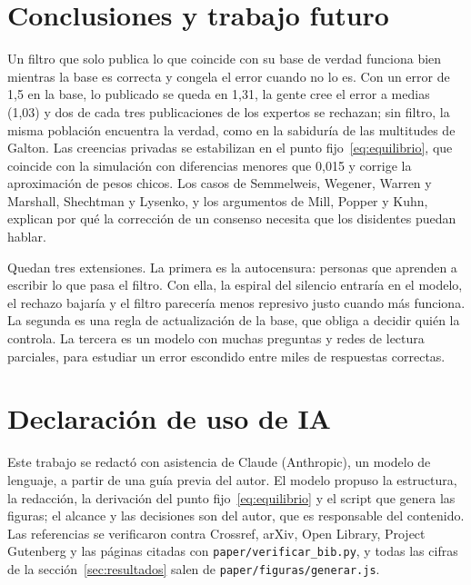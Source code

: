 \documentclass[11pt,a4paper]{article}
\begin{document}
\section{Conclusiones y trabajo futuro}\label{sec:conclusiones}

Un filtro que solo publica lo que coincide con su base de verdad funciona bien mientras la base es correcta y congela el error cuando no lo es. Con un error de 1,5 en la base, lo publicado se queda en 1,31, la gente cree el error a medias (1,03) y dos de cada tres publicaciones de los expertos se rechazan; sin filtro, la misma población encuentra la verdad, como en la sabiduría de las multitudes de Galton. Las creencias privadas se estabilizan en el punto fijo~\eqref{eq:equilibrio}, que coincide con la simulación con diferencias menores que 0,015 y corrige la aproximación de pesos chicos. Los casos de Semmelweis, Wegener, Warren y Marshall, Shechtman y Lysenko, y los argumentos de Mill, Popper y Kuhn, explican por qué la corrección de un consenso necesita que los disidentes puedan hablar.

Quedan tres extensiones. La primera es la autocensura: personas que aprenden a escribir lo que pasa el filtro. Con ella, la espiral del silencio entraría en el modelo, el rechazo bajaría y el filtro parecería menos represivo justo cuando más funciona. La segunda es una regla de actualización de la base, que obliga a decidir quién la controla. La tercera es un modelo con muchas preguntas y redes de lectura parciales, para estudiar un error escondido entre miles de respuestas correctas.

\section*{Declaración de uso de IA}

Este trabajo se redactó con asistencia de Claude (Anthropic), un modelo de lenguaje, a partir de una guía previa del autor. El modelo propuso la estructura, la redacción, la derivación del punto fijo~\eqref{eq:equilibrio} y el script que genera las figuras; el alcance y las decisiones son del autor, que es responsable del contenido. Las referencias se verificaron contra Crossref, arXiv, Open Library, Project Gutenberg y las páginas citadas con \texttt{paper/verificar\_bib.py}, y todas las cifras de la sección~\ref{sec:resultados} salen de \texttt{paper/figuras/generar.js}.

\printbibliography
\end{document}
